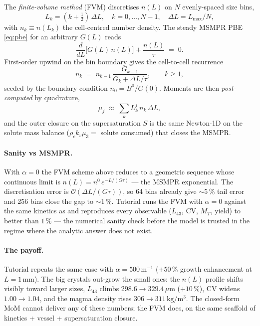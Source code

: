 \documentclass[11pt,a4paper]{article}
\begin{document}
The \emph{finite-volume method} (FVM) discretises $n(L)$ on $N$
evenly-spaced size bins,
\begin{equation}
   L_k = (k+\tfrac{1}{2})\,\Delta L,
   \quad k = 0, \dots, N{-}1,
   \quad \Delta L = L_{\max}/N,
\end{equation}
with $n_k \equiv n(L_k)$ the cell-centred number density.  The steady
MSMPR PBE \eqref{eq:pbe} for an arbitrary $G(L)$ reads
\begin{equation}
   \frac{d}{dL}\bigl[G(L)\,n(L)\bigr] + \frac{n(L)}{\tau} \;=\; 0.
\end{equation}
First-order upwind on the bin boundary gives the cell-to-cell
recurrence
\begin{equation}
   n_k \;=\; n_{k-1}\,\frac{G_{k-1}}{G_k + \Delta L/\tau},
   \qquad k \ge 1,
\end{equation}
seeded by the boundary condition $n_0 = B^0/G(0)$.  Moments are then
\emph{post-computed} by quadrature,
\begin{equation}
   \mu_j \;\approx\; \sum_{k} L_k^j\,n_k\,\Delta L,
\end{equation}
and the outer closure on the supersaturation $S$ is the same Newton-1D
on the solute mass balance ($\rho_c k_v \mu_3 = $ solute consumed) that
closes the MSMPR.

\paragraph{Sanity vs MSMPR.}  With $\alpha = 0$ the FVM scheme above
reduces to a geometric sequence whose continuous limit is
$n(L)=n^0\,e^{-L/(G\tau)}$ --- the MSMPR exponential.  The
discretisation error is $\mathcal{O}(\Delta L/(G\tau))$, so 64 bins
already give $\sim 5\,\%$ tail error and 256 bins close the gap to
$\sim 1\,\%$.  Tutorial 
runs the FVM with $\alpha = 0$ against the same kinetics as
 and reproduces every observable
($L_{43}$, $\mathrm{CV}$, $M_T$, yield) to better than $1\,\%$ --- the
numerical sanity check before the model is trusted in the regime where
the analytic answer does not exist.

\paragraph{The payoff.}  Tutorial
 repeats the same case
with $\alpha = 500\,\mathrm{m^{-1}}$ ($+50\,\%$ growth enhancement at
$L = 1\,\mathrm{mm}$).  The big crystals out-grow the small ones: the
$n(L)$ profile shifts visibly toward larger sizes, $L_{43}$ climbs
$298.6 \to 329.4\,\mu\mathrm{m}$ ($+10\,\%$), $\mathrm{CV}$ widens
$1.00 \to 1.04$, and the magma density rises $306 \to 311\,\mathrm{kg/m^3}$.
The closed-form MoM cannot deliver any of these numbers; the FVM does,
on the same scaffold of kinetics + vessel + supersaturation closure.
\end{document}
